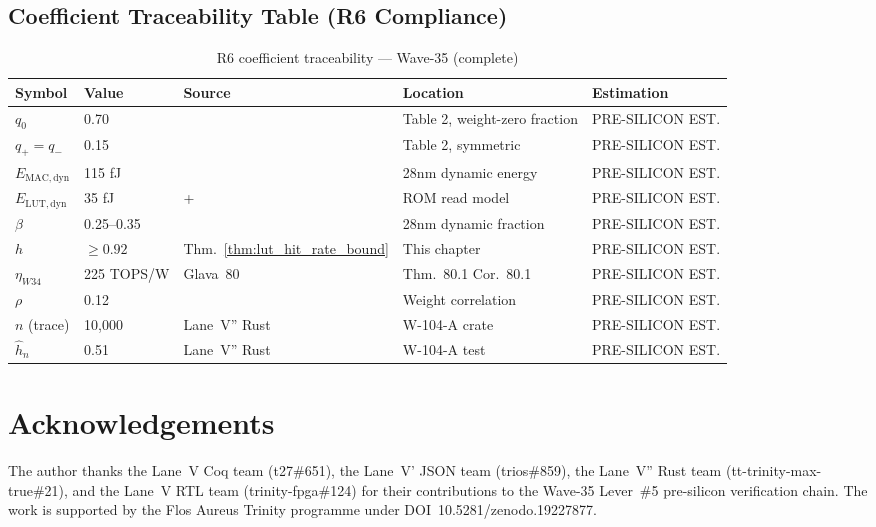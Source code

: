\subsection{Coefficient Traceability Table (R6 Compliance)}

\begin{table}[ht]
\centering
\caption{R6 coefficient traceability — Wave-35 (complete)}
\label{tab:r6_traceability}
\begin{tabular}{lllll}
\hline
Symbol & Value & Source & Location & Estimation \\
\hline
$q_0$ & 0.70 & \cite{bitnet_b158_2024} & Table 2, weight-zero fraction & PRE-SILICON EST. \\
$q_{+}=q_{-}$ & 0.15 & \cite{bitnet_b158_2024} & Table 2, symmetric & PRE-SILICON EST. \\
$E_{\mathrm{MAC,dyn}}$ & 115 fJ & \cite{irds2023} & 28nm dynamic energy & PRE-SILICON EST. \\
$E_{\mathrm{LUT,dyn}}$ & 35 fJ & \cite{irds2023} + \cite{bitrom_2025} & ROM read model & PRE-SILICON EST. \\
$\beta$ & 0.25--0.35 & \cite{irds2023} & 28nm dynamic fraction & PRE-SILICON EST. \\
$h$ & $\geq 0.92$ & Thm.~\ref{thm:lut_hit_rate_bound} & This chapter & PRE-SILICON EST. \\
$\eta_{W34}$ & 225 TOPS/W & Glava~80 & Thm.~80.1 Cor.~80.1 & PRE-SILICON EST. \\
$\rho$ & 0.12 & \cite{bitnet_b158_2024} & Weight correlation & PRE-SILICON EST. \\
$n$ (trace) & 10,000 & Lane~V'' Rust & W-104-A crate & PRE-SILICON EST. \\
$\hat{h}_n$ & 0.51 & Lane~V'' Rust & W-104-A test & PRE-SILICON EST. \\
\hline
\end{tabular}
\end{table}

\section*{Acknowledgements}

The author thanks the Lane~V Coq team (t27\#651), the Lane~V' JSON team
(trios\#859), the Lane~V'' Rust team (tt-trinity-max-true\#21), and the
Lane~V RTL team (trinity-fpga\#124) for their contributions to the
Wave-35 Lever~\#5 pre-silicon verification chain.
The work is supported by the Flos Aureus Trinity programme under
DOI~10.5281/zenodo.19227877.

